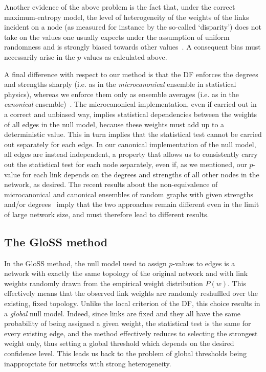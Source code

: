 \documentclass[aps,twocolumn,superscriptaddress]{revtex4-1}
\newcommand{\gloss}{GloSS }
\begin{document}
Another evidence of the above problem is the fact that, under the correct maximum-entropy model, the level of heterogeneity of the weights of the links incident on a node (as measured for instance by the so-called `disparity') does not take on the values one usually expects under the assumption of uniform randomness and is strongly biased towards other values~\cite{bose-fermi}.
A consequent bias must necessarily arise in the $p$-values as calculated above.

A final difference with respect to our method is that the DF enforces the degrees and strengths sharply (i.e. as in the \emph{microcanonical} ensemble in statistical physics), whereas we enforce them only as ensemble averages (i.e. as in the \emph{canonical} ensemble)~\cite{squartini-njp-2015}. 
The microcanonical implementation, even if carried out in a correct and unbiased way, implies statistical dependencies between the weights of all edges in the null model, because these weights must add up to a deterministic value. This in turn implies that the statistical test cannot be carried out separately for each edge.
In our canonical implementation of the null model, all edges are instead independent, a property that allows us to consistently carry out the statistical test for each node separately, even if, as we mentioned, our $p$-value for each link depends on the degrees and strengths of all other nodes in the network, as desired.
The recent results about the non-equivalence of microcanonical and canonical ensembles of random graphs with given strengths and/or degrees~\cite{squartini-njp-2015,squartini-prl-2015,garlaschelli-jpa-2016} imply that the two approaches remain different even in the limit of large network size, and must therefore lead to different results.

\subsection{The \gloss method}
In the \gloss method, the null model used to assign $p$-values to edges is a network with exactly the same topology of the original network and with link weights randomly drawn from the empirical weight distribution $P(w)$. 
This effectively means that the observed link weights are randomly reshuffled over the existing, fixed topology.
Unlike the local criterion of the DF, this choice results in a \emph{global} null model.
Indeed, since links are fixed and they all have the same probability of being assigned a given weight, the statistical test is the same for every existing edge, and the method effectively reduces to selecting the strongest weight only, thus setting a global threshold which depends on the desired confidence level. This leads us back to the problem of global thresholds being inappropriate for networks with strong heterogeneity.
\end{document}
